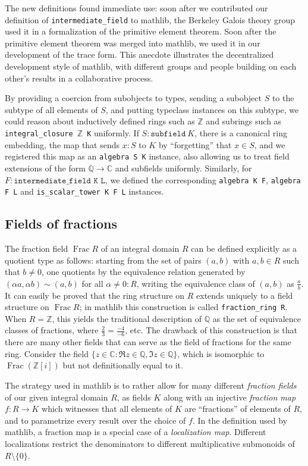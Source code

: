 \documentclass[a4paper,USenglish,cleveref, autoref, thm-restate]{lipics-v2021}
\newcommand{\C}{\mathbb{C}}
\newcommand{\lean}[1]{\texttt{#1}\xspace}
\newcommand{\mathlib}{\textsf{mathlib}\xspace}
\newcommand{\Q}{\mathbb{Q}}
\newcommand{\Z}{\mathbb{Z}}
\DeclareMathOperator{\Frac}{Frac}
\begin{document}
The new definitions found immediate use:
soon after we contributed our definition of \lean{intermediate\_field} to \mathlib,
the Berkeley Galois theory group used it in a formalization of the primitive element theorem.
Soon after the primitive element theorem was merged into \mathlib,
we used it in our development of the trace form.
This anecdote illustrates the decentralized development style of \mathlib,
with different groups and people building on each other's results in a collaborative process.

By providing a coercion from subobjects to types, sending a subobject $S$ to the subtype of all elements of $S$,
and putting typeclass instances on this subtype,
we could reason about inductively defined rings such as $\Z$ and subrings such as \lean{integral\_closure $\Z$ K} uniformly.
If $S : \lean{subfield}\ K$, there is a canonical ring embedding, the map that sends $x : S$ to $K$ by ``forgetting'' that $x \in S$,
and we registered this map as an \lean{algebra S K} instance, also allowing us to treat field extensions of the form $\Q \to \C$ and subfields uniformly.
Similarly, for $F : \lean{intermediate\_field K L}$, we defined the corresponding \lean{algebra K F}, \lean{algebra F L} and \lean{is\_scalar\_tower K F L} instances.

\subsection{Fields of fractions}\label{subsection : fields of fractions}
The fraction field $\Frac R$ of an integral domain $R$ can be defined explicitly as a quotient type as follows:
starting from the set of pairs $(a,b)$ with $a,b \in R$ such that $b\neq 0$,
one quotients by the equivalence relation generated by $(\alpha a, \alpha b) \sim (a,b)$ for all $\alpha \ne 0 : R$, writing the equivalence class of $(a,b)$ as $\frac{a}{b}$.
It can easily be proved that the ring structure on $R$ extends uniquely to a field structure on $\Frac R$;
in \mathlib this construction is called \mbox{\lean{fraction\_ring R}}.
When $R=\Z$, this yields the traditional description of $\Q$ as the set of equivalence classes of fractions, where $\frac{2}{3}=\frac{-4}{-6}$, etc.
The drawback of this construction is that there are many other fields that can serve as the field of fractions for the same ring.
Consider the field $\{z \in \C : \Re z \in \Q, \Im z\in\Q\}$, which is isomorphic to $\Frac (\Z[i])$ but not definitionally equal to it.

The strategy used in \mathlib is to rather allow for many different \emph{fraction fields} of our given integral domain $R$,
as fields $K$ along with an injective \emph{fraction map} $f \colon R \to K$ which witnesses that all elements of $K$ are ``fractions'' of elements of $R$,
and to parametrize every result over the choice of $f$.
In the definition used by \mathlib, a fraction map is a special case of a \emph{localization map}.
Different localizations restrict the denominators to different multiplicative submonoids of $R\setminus\{0\}$.
\end{document}
